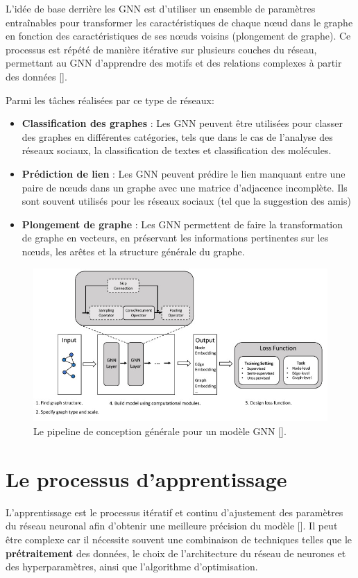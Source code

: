 \medskip
L'idée de base derrière les GNN est d'utiliser un ensemble de paramètres entraînables pour transformer les caractéristiques de chaque nœud dans le graphe en fonction des caractéristiques de ses nœuds voisins (plongement de graphe). Ce processus est répété de manière itérative sur plusieurs couches du réseau, permettant au GNN d'apprendre des motifs et des relations complexes à partir des données [\cite{ZHOU202057}].

\medskip
Parmi les tâches réalisées par ce type de réseaux:
\begin{itemize}
	\item \textbf{Classification des graphes} : Les GNN peuvent être utilisées pour classer des graphes en différentes catégories, tels que dans le cas de l'analyse des réseaux sociaux, la classification de textes et classification des molécules.
	\item \textbf{Prédiction de lien} : Les GNN peuvent prédire le lien manquant entre une paire de nœuds dans un graphe avec une matrice d'adjacence incomplète. Ils sont souvent utilisés pour les réseaux sociaux (tel que la suggestion des amis)
	\item \textbf{Plongement de graphe} : Les GNN permettent de faire la transformation de graphe en vecteurs, en préservant les informations pertinentes sur les nœuds, les arêtes et la structure générale du graphe.
\end{itemize}

\begin{figure}[hbt!]
	\centering
	\includegraphics[width=15cm]{images_pfe/gnn.jpg}
	\caption{Le pipeline de conception générale pour un modèle GNN [\cite{ZHOU202057}].}
	\label{fig:gnn}
\end{figure}
\FloatBarrier
\medskip

\section{Le processus d’apprentissage}
L’apprentissage est le processus itératif et continu d’ajustement des
paramètres du réseau neuronal afin d’obtenir une meilleure précision du modèle
[\cite{Goodfellow-et-al-2016}]. Il peut être complexe car il nécessite souvent
une combinaison de techniques telles que le \textbf{prétraitement} des données,
le choix de l'architecture du réseau de neurones et des hyperparamètres, ainsi
que l'algorithme d'optimisation.


